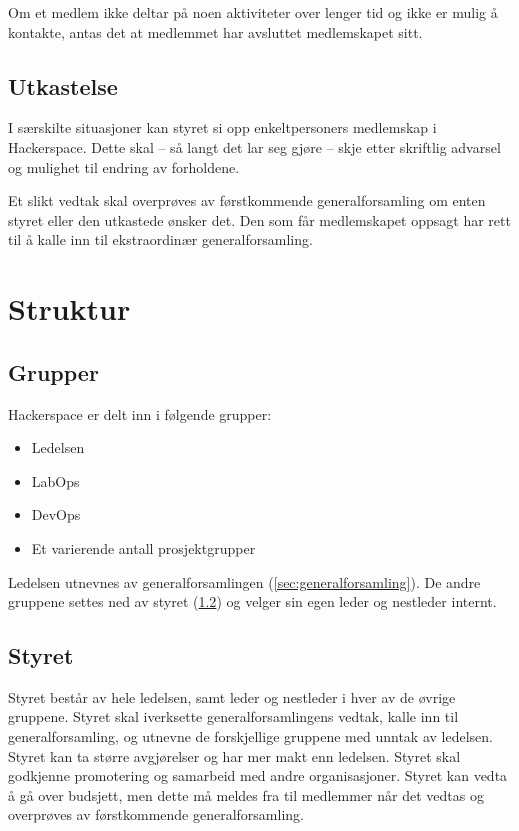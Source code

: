 Om et medlem ikke deltar på noen aktiviteter over lenger tid og ikke er mulig å kontakte, antas det at medlemmet har avsluttet medlemskapet sitt.

\subsection{Utkastelse}\label{sec:medlemskap:utkastelse}
I særskilte situasjoner kan styret si opp enkeltpersoners medlemskap i Hackerspace.
Dette skal -- så langt det lar seg gjøre -- skje etter skriftlig advarsel og mulighet til endring av forholdene.

Et slikt vedtak skal overprøves av førstkommende generalforsamling om enten styret eller den utkastede ønsker det. Den som får medlemskapet oppsagt har rett til å kalle inn til ekstraordinær generalforsamling.


\section{Struktur}\label{sec:struktur}
\subsection{Grupper}\label{sec:struktur:grupper}
Hackerspace er delt inn i følgende grupper:
\begin{itemize}
\item Ledelsen
\item LabOps
\item DevOps
\item Et varierende antall prosjektgrupper
\end{itemize}
Ledelsen utnevnes av generalforsamlingen (\ref{sec:generalforsamling}). De andre gruppene settes ned av styret (\ref{sec:struktur:styret}) og velger sin egen leder og nestleder internt.

\subsection{Styret}\label{sec:struktur:styret}
Styret består av hele ledelsen, samt leder og nestleder i hver av de øvrige gruppene.
Styret skal iverksette generalforsamlingens vedtak, kalle inn til generalforsamling, og utnevne de forskjellige gruppene med unntak av ledelsen.
Styret kan ta større avgjørelser og har mer makt enn ledelsen.
Styret skal godkjenne promotering og samarbeid med andre organisasjoner.
Styret kan vedta å gå over budsjett, men dette må meldes fra til medlemmer når det vedtas og overprøves av førstkommende generalforsamling.

